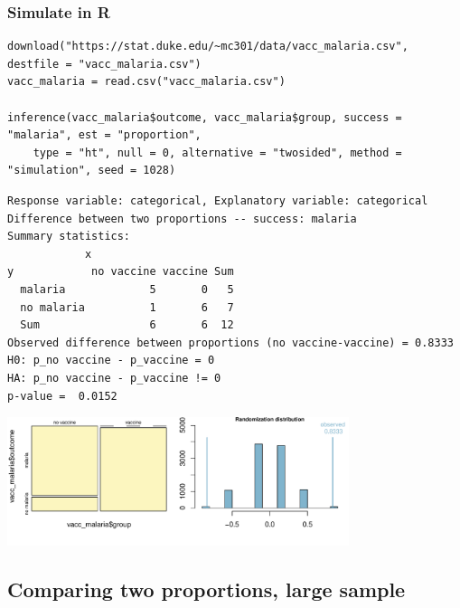 \documentclass[11pt,containsverbatim,handout,xcolor=xelatex,dvipsnames,table]{beamer}
\begin{document}
\begin{frame}[fragile]
\frametitle{Simulate in R}

\vspace{-0.25cm}

{\tiny
\begin{Verbatim}[frame=single, formatcom=\color{blue}]
download("https://stat.duke.edu/~mc301/data/vacc_malaria.csv", destfile = "vacc_malaria.csv")
vacc_malaria = read.csv("vacc_malaria.csv")

inference(vacc_malaria$outcome, vacc_malaria$group, success = "malaria", est = "proportion", 
    type = "ht", null = 0, alternative = "twosided", method = "simulation", seed = 1028)
\end{Verbatim}
}

\pause

{\tiny
\begin{Verbatim}[frame=single, formatcom=\color{gray}]
Response variable: categorical, Explanatory variable: categorical
Difference between two proportions -- success: malaria
Summary statistics:
            x
y            no vaccine vaccine Sum
  malaria             5       0   5
  no malaria          1       6   7
  Sum                 6       6  12
Observed difference between proportions (no vaccine-vaccine) = 0.8333
H0: p_no vaccine - p_vaccine = 0 
HA: p_no vaccine - p_vaccine != 0 
p-value =  0.0152 
\end{Verbatim}
}

\includegraphics[width=0.75\textwidth]{figures/malaria/malaria}

\end{frame}


\subsection{Comparing two proportions, large sample}


\begin{frame}

\vfill


\vfill

\end{frame}
\end{document}
